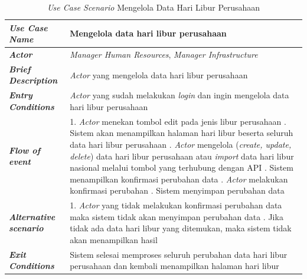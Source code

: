 \FloatBarrier
\begin{longtable}{ |p{6cm}|p{8cm}|}
\caption{\textit{Use Case Scenario} Mengelola Data Hari Libur Perusahaan}\label{tab:use-case-scenario-mengelola-data-hari-libur-perusahaan} 
\\
\hline
\textbf{\textit{Use Case Name}}
&Mengelola data hari libur perusahaan
\\ \hline

\textbf{\textit{Actor}}
&\textit{Manager Human Resources}, \textit{Manager Infrastructure}
\\ \hline

\textbf{\textit{Brief Description}}
&\textit{Actor} yang mengelola data hari libur perusahaan
\\ \hline

\textbf{\textit{Entry Conditions}}
&\textit{Actor} yang sudah melakukan \textit{login} dan ingin mengelola data hari libur perusahaan
\\ \hline

\textbf{\textit{Flow of event}}
&1. \textit{Actor} menekan tombol edit pada jenis libur perusahaan
\newline
2. Sistem akan menampilkan halaman hari libur beserta seluruh data hari libur perusahaan
\newline
3. \textit{Actor} mengelola (\textit{create, update, delete}) data hari libur perusahaan atau \textit{import} data hari libur nasional melalui tombol yang terhubung dengan API
\newline
4. Sistem menampilkan konfirmasi perubahan data
\newline
5. \textit{Actor} melakukan konfirmasi perubahan
\newline
6. Sistem menyimpan perubahan data
\\ \hline

\textbf{\textit{Alternative scenario}}
&1. \textit{Actor} yang tidak melakukan konfirmasi perubahan data maka sistem tidak akan menyimpan perubahan data
\newline
2. Jika tidak ada data hari libur yang ditemukan, maka sistem tidak akan menampilkan hasil
\\ \hline

\textbf{\textit{Exit Conditions}}
&Sistem selesai memproses seluruh perubahan data hari libur perusahaan dan kembali menampilkan halaman hari libur
\\ \hline
\end{longtable}

